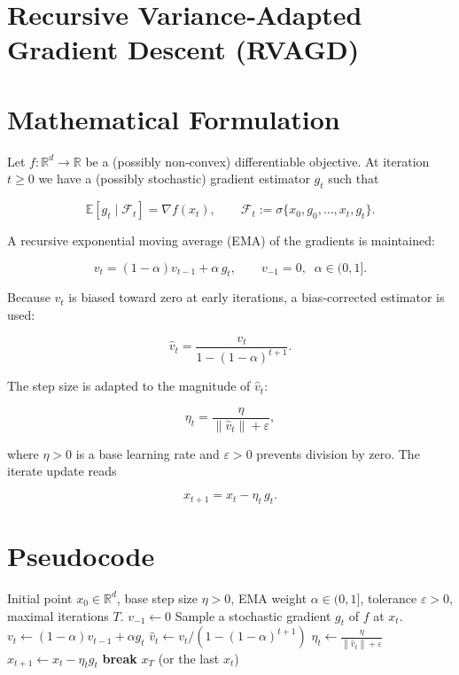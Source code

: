 \documentclass{article}
\newcommand{\E}{\mathbb{E}}
\newcommand{\norm}[1]{\left\|#1\right\|}
\begin{document}
\section*{Recursive Variance‑Adapted Gradient Descent (RVAGD)}

\section*{Mathematical Formulation}
Let $f:\mathbb{R}^d\rightarrow\mathbb{R}$ be a (possibly non‑convex) differentiable objective.  
At iteration $t\ge 0$ we have a (possibly stochastic) gradient estimator $g_t$ such that  

\[
\E\!\left[g_t\mid \mathcal{F}_t\right]=\nabla f(x_t),\qquad 
\mathcal{F}_t:=\sigma\{x_0,g_0,\dots ,x_t,g_t\}.
\]

A recursive exponential moving average (EMA) of the gradients is maintained:

\[
\boxed{v_t=(1-\alpha)v_{t-1}+\alpha\,g_t},\qquad v_{-1}=0,\;\; \alpha\in(0,1].
\tag{1}
\]

Because $v_t$ is biased toward zero at early iterations, a bias‑corrected estimator is used:

\[
\boxed{\hat v_t=\frac{v_t}{1-(1-\alpha)^{t+1}}}.
\tag{2}
\]

The step size is adapted to the magnitude of $\hat v_t$:

\[
\boxed{\eta_t=\frac{\eta}{\norm{\hat v_t}+\varepsilon}},
\tag{3}
\]

where $\eta>0$ is a base learning rate and $\varepsilon>0$ prevents division by zero.  
The iterate update reads

\[
\boxed{x_{t+1}=x_t-\eta_t\,g_t }.
\tag{4}
\]

\section*{Pseudocode}
\begin{algorithm}[H]
\caption{Recursive Variance‑Adapted Gradient Descent (RVAGD)}
\begin{algorithmic}[1]
\Require Initial point $x_0\in\mathbb{R}^d$, base step size $\eta>0$, EMA weight $\alpha\in(0,1]$, tolerance $\varepsilon>0$, maximal iterations $T$.
\State $v_{-1}\gets 0$ 
    \State Sample a stochastic gradient $g_t$ of $f$ at $x_t$.
    \State $v_t\gets (1-\alpha)v_{t-1}+\alpha g_t$ 
    \State $\hat v_t\gets v_t/(1-(1-\alpha)^{t+1})$ 
    \State $\eta_t\gets \displaystyle\frac{\eta}{\norm{\hat v_t}+\varepsilon}$ 
    \State $x_{t+1}\gets x_t-\eta_t g_t$ 
    \If{$\norm{g_t}\le \text{tol}$}
        \State \textbf{break}
    \EndIf
\EndFor
\State \Return $x_{T}$ (or the last $x_t$)
\end{algorithmic}
\end{algorithm}
\end{document}
